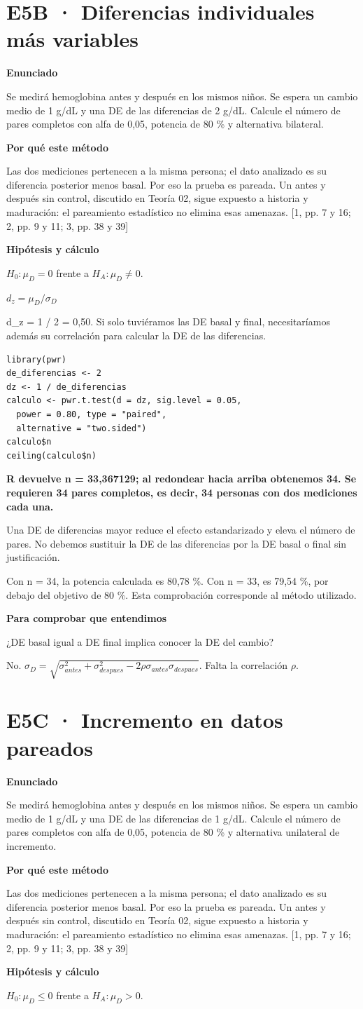 \documentclass[10pt,a4paper]{article}
\newcommand{\etiqueta}[1]{\par{\bfseries\color{Blue}#1}\par}
\newcommand{\cajares}[1]{\par\colorbox{Pale}{\parbox{\dimexpr\linewidth-2\fboxsep}{\vspace{4pt}\textbf{\color{Navy}#1}\vspace{4pt}}}\par}
\begin{document}
\section*{E5B · Diferencias individuales más variables}
\etiqueta{Enunciado}
Se medirá hemoglobina antes y después en los mismos niños. Se espera un cambio medio de 1 g/dL y una DE de las diferencias de 2 g/dL. Calcule el número de pares completos con alfa de 0,05, potencia de 80 \% y alternativa bilateral.
\etiqueta{Por qué este método}
Las dos mediciones pertenecen a la misma persona; el dato analizado es su diferencia posterior menos basal. Por eso la prueba es pareada. Un antes y después sin control, discutido en Teoría 02, sigue expuesto a historia y maduración: el pareamiento estadístico no elimina esas amenazas. [1, pp. 7 y 16; 2, pp. 9 y 11; 3, pp. 38 y 39]
\etiqueta{Hipótesis y cálculo}
$H_0:\mu_D=0$ frente a $H_A:\mu_D\ne0$.

$d_z=\mu_D/\sigma_D$

d\_z = 1 / 2 = 0,50. Si solo tuviéramos las DE basal y final, necesitaríamos además su correlación para calcular la DE de las diferencias.
\begin{Verbatim}
library(pwr)
de_diferencias <- 2
dz <- 1 / de_diferencias
calculo <- pwr.t.test(d = dz, sig.level = 0.05,
  power = 0.80, type = "paired",
  alternative = "two.sided")
calculo$n
ceiling(calculo$n)
\end{Verbatim}
\cajares{R devuelve n = 33,367129; al redondear hacia arriba obtenemos 34. Se requieren 34 pares completos, es decir, 34 personas con dos mediciones cada una.}
Una DE de diferencias mayor reduce el efecto estandarizado y eleva el número de pares. No debemos sustituir la DE de las diferencias por la DE basal o final sin justificación.

{\small\color{Gray}Con n = 34, la potencia calculada es 80,78 \%. Con n = 33, es 79,54 \%, por debajo del objetivo de 80 \%. Esta comprobación corresponde al método utilizado.}
\etiqueta{Para comprobar que entendimos}
¿DE basal igual a DE final implica conocer la DE del cambio?

{\small No. $\sigma_D=\sqrt{\sigma_{antes}^2+\sigma_{despues}^2-2\rho\sigma_{antes}\sigma_{despues}}$. Falta la correlación $\rho$.}
\clearpage
\section*{E5C · Incremento en datos pareados}
\etiqueta{Enunciado}
Se medirá hemoglobina antes y después en los mismos niños. Se espera un cambio medio de 1 g/dL y una DE de las diferencias de 1 g/dL. Calcule el número de pares completos con alfa de 0,05, potencia de 80 \% y alternativa unilateral de incremento.
\etiqueta{Por qué este método}
Las dos mediciones pertenecen a la misma persona; el dato analizado es su diferencia posterior menos basal. Por eso la prueba es pareada. Un antes y después sin control, discutido en Teoría 02, sigue expuesto a historia y maduración: el pareamiento estadístico no elimina esas amenazas. [1, pp. 7 y 16; 2, pp. 9 y 11; 3, pp. 38 y 39]
\etiqueta{Hipótesis y cálculo}
$H_0:\mu_D\le0$ frente a $H_A:\mu_D>0$.
\end{document}
